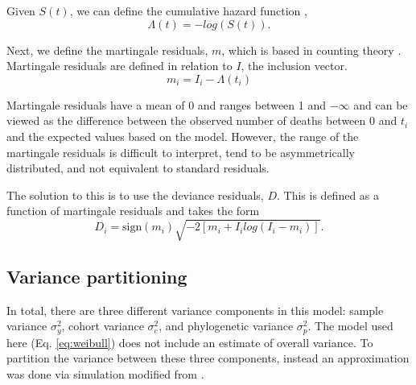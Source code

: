 \documentclass[12pt,letterpaper]{article}
\begin{document}
Given \(S(t)\), we can define the cumulative hazard function \citep{Klein2003}, 
\begin{equation*}
  \Lambda(t) = -log(S(t)).
\end{equation*}

Next, we define the martingale residuals, \(m\), which is based in counting theory \citep{Therneau1990}. Martingale residuals are defined in relation to \(I\), the inclusion vector. 
\begin{equation*}
  m_{i} = I_{i} - \Lambda(t_i)
\end{equation*}

Martingale residuals have a mean of 0 and ranges between 1 and \(-\infty\) and can be viewed as the difference between the observed number of deaths between 0 and \(t_{i}\) and the expected values based on the model. However, the range of the martingale residuals is difficult to interpret, tend to be asymmetrically distributed, and not equivalent to standard residuals. 

The solution to this is to use the deviance residuals, \(D\). This is defined as a function of martingale residuals and takes the form
\begin{equation*}
  D_{i} = \text{sign}(m_{i}) \sqrt{-2[m_{i} + I_{i}log(I_{i} - m_{i})]}.
\end{equation*}


\subsection{Variance partitioning}
In total, there are three different variance components in this model: sample variance \(\sigma_{y}^{2}\), cohort variance \(\sigma_{c}^{2}\), and phylogenetic variance \(\sigma_{p}^{2}\). The model used here (Eq. \ref{eq:weibull}) does not include an estimate of overall variance. To partition the variance between these three components, instead an approximation was done via simulation modified from \citet{Goldstein2002}.
\end{document}
